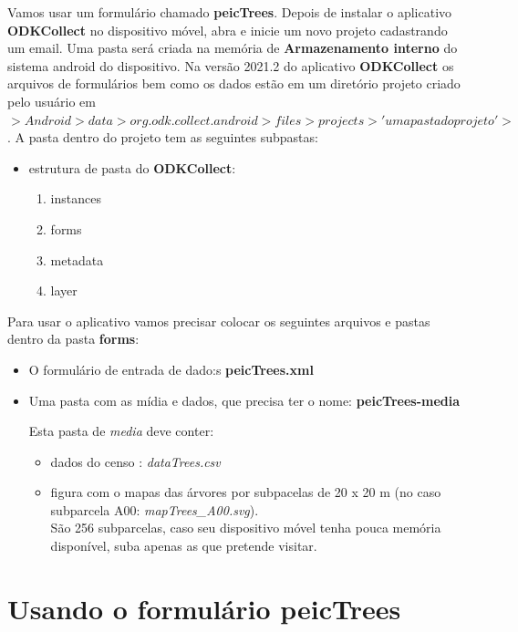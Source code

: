 \documentclass[a4paper, oneside, 10pt]{article}
\begin{document}
Vamos usar um formulário chamado \textbf{peicTrees}. Depois de instalar o aplicativo \textbf{ODKCollect} no dispositivo móvel, abra e inicie um novo projeto cadastrando um email.  Uma pasta será criada na memória de \textbf{Armazenamento interno} do sistema android do dispositivo. Na versão 2021.2 do aplicativo \textbf{ODKCollect} os arquivos de formulários bem como os dados estão em um diretório projeto criado pelo usuário em $>Android > data > org.odk.collect.android> files > projects > 'uma pasta do projeto' >$. A pasta dentro do projeto tem as seguintes subpastas:
\begin{itemize}
  \item estrutura de pasta do \textbf{ODKCollect}:

  \begin{enumerate}
      \item instances
      \item forms
      \item metadata
      \item layer
    \end{enumerate}
    \end{itemize}


Para usar o aplicativo vamos precisar colocar os seguintes arquivos e pastas dentro da pasta \textbf{forms}:
  \begin{itemize}
  \item O formulário de entrada de dado:s \textbf{peicTrees.xml}
  \item Uma pasta com as mídia e dados, que precisa ter o nome: \textbf{peicTrees-media}

    Esta pasta de \textit{media} deve conter:

    \begin{itemize}
    \item dados do censo : \textit{dataTrees.csv}
    \item figura com o mapas das árvores por subpacelas de 20 x 20 m (no caso subparcela A00: \textit{mapTrees\_A00.svg}).\\
        São 256 subparcelas, caso seu dispositivo móvel tenha pouca memória disponível, suba apenas as que pretende visitar. 
      \end{itemize}
    \end{itemize}



\section{\texorpdfstring{Usando o formulário peicTrees}{Usando o formulario peicTrees}}
\label{sec:usando_o_formulario_censopeic}
\end{document}
